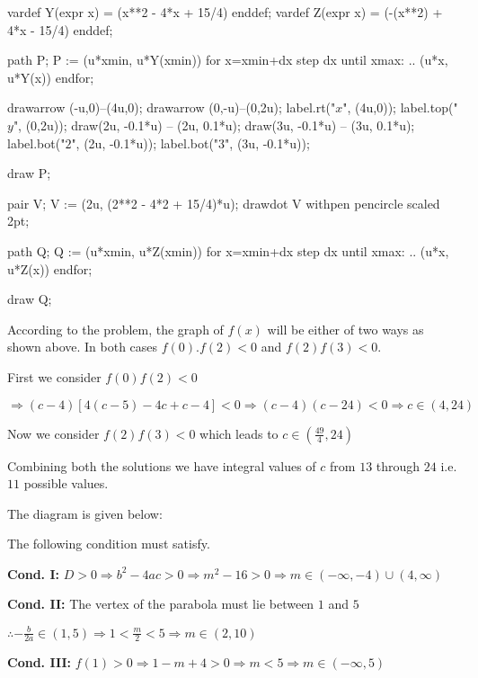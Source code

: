       vardef Y(expr x) = (x**2 - 4*x + 15/4) enddef;
      vardef Z(expr x) = (-(x**2) + 4*x - 15/4) enddef;

      path P;
      P := (u*xmin, u*Y(xmin))
      for x=xmin+dx step dx until xmax:
      .. (u*x, u*Y(x))
      endfor;

      drawarrow (-u,0)--(4u,0);
      drawarrow (0,-u)--(0,2u);
      label.rt("$x$", (4u,0));
      label.top("$y$", (0,2u));
      draw(2u, -0.1*u) -- (2u, 0.1*u);
      draw(3u, -0.1*u) -- (3u, 0.1*u);
      label.bot("$2$", (2u, -0.1*u));
      label.bot("$3$", (3u, -0.1*u));

      draw P;

      pair V;
      V := (2u, (2**2 - 4*2 + 15/4)*u);
      drawdot V withpen pencircle scaled 2pt;

      path Q;
      Q := (u*xmin, u*Z(xmin))
      for x=xmin+dx step dx until xmax:
      .. (u*x, u*Z(x))
      endfor;

      draw Q;
    \stopMPcode
  \stopplacefigure

  According to the problem, the graph of $f(x)$ will be either of two ways as shown above. In both cases
  $f(0).f(2) < 0$ and $f(2)f(3) < 0$.

  First we consider $f(0)f(2) < 0$

  $\Rightarrow (c - 4)[4(c - 5) - 4c + c - 4] < 0 \Rightarrow (c - 4)(c - 24) < 0\Rightarrow c\in(4, 24)$

  Now we consider $f(2)f(3) < 0$ which leads to $c\in\left(\frac{49}{4}, 24\right)$

  Combining both the solutions we have integral values of $c$ from $13$ through $24$ i.e. $11$ possible
  values.
\item The diagram is given below:

  The following condition must satisfy.

  {\bf Cond. I:} $D > 0 \Rightarrow b^2 - 4ac > 0 \Rightarrow m^2 - 16 > 0\Rightarrow m\in(-\infty,
  -4)\cup(4, \infty)$

  {\bf Cond. II:} The vertex of the parabola must lie between $1$ and $5$

  $\therefore -\frac{b}{2a}\in(1, 5)\Rightarrow 1 < \frac{m}{2} < 5\Rightarrow m\in(2, 10)$

  {\bf Cond. III:} $f(1) > 0\Rightarrow 1 - m + 4 > 0 \Rightarrow m < 5 \Rightarrow m\in(-\infty, 5)$

